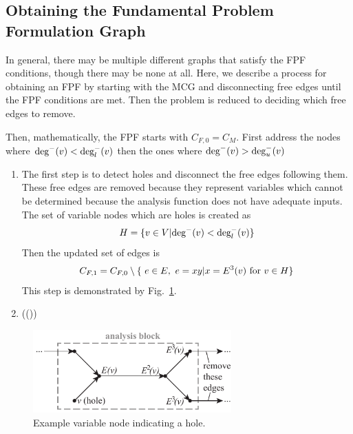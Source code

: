 \subsection{Obtaining the Fundamental Problem Formulation Graph}
In general, there may be multiple different graphs that satisfy the FPF conditions, though there may be none at all. Here, we describe a process for obtaining an FPF by starting with the MCG and disconnecting free edges until the FPF conditions are met. Then the problem is reduced to deciding which free edges to remove.

Then, mathematically, the FPF starts with $C_{F,0} = C_M$.
First address the nodes where $\textrm{deg}^-(v) < \textrm{deg}_l^-(v)$ then the ones where $\textrm{deg}^-(v) > \textrm{deg}_u^-(v)$

\begin{enumerate}
\item The first step is to detect holes and disconnect the free edges following them. These free edges are removed because they represent variables which cannot be determined because the analysis function does not have adequate inputs. The set of variable nodes which are holes is created as
\begin{equation}
H = \{v \in V | \textrm{deg}^-(v) < \textrm{deg}_l^-(v) \}
\end{equation}
Then the updated set of edges is
\begin{equation}
C_{F,1} = C_{F,0} \setminus \{\ e \in E, \ e=xy | x=E^3(v) \textrm{ for } v \in H\}
\end{equation}
This step is demonstrated by Fig.~\ref{f:holes}.
\item (())
\end{enumerate}
\begin{figure}[htb!]
	\begin{center}
	\includegraphics[width=3in]{images/analysis_block_hole}
	\end{center}
	\vspace{-20pt}
\caption{Example variable node indicating a hole.}
\label{f:holes}
\end{figure}


